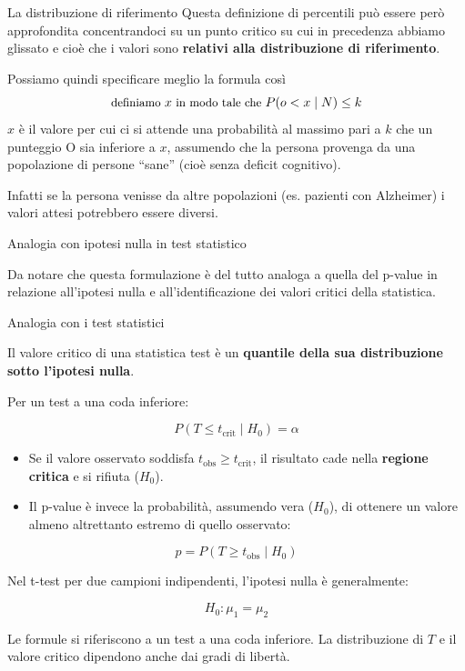 \documentclass[
  ignorenonframetext,
  aspectratio=169,
]{beamer}
\begin{document}
\begin{frame}{La distribuzione di riferimento}
\label{la-distribuzione-di-riferimento}
Questa definizione di percentili può essere però approfondita
concentrandoci su un punto critico su cui in precedenza abbiamo glissato
e cioè che i valori sono \textbf{relativi alla distribuzione di
riferimento}.

Possiamo quindi specificare meglio la formula così \[
\small
\text{definiamo}\ x\ \text{in modo tale che}\ P(o < x \mid N) \leq k
\] \(x\) è il valore per cui ci si attende una probabilità al massimo
pari a \(k\) che un punteggio O sia inferiore a \(x\), assumendo che la
persona provenga da una popolazione di persone ``sane'' (cioè senza
deficit cognitivo).

Infatti se la persona venisse da altre popolazioni (es. pazienti con
Alzheimer) i valori attesi potrebbero essere diversi.
\end{frame}

\begin{frame}{Analogia con ipotesi nulla in test statistico}
\label{analogia-con-ipotesi-nulla-in-test-statistico}
\small

Da notare che questa formulazione è del tutto analoga a quella del
p-value in relazione all'ipotesi nulla e all'identificazione dei valori
critici della statistica.
\end{frame}

\begin{frame}{Analogia con i test statistici}
\label{analogia-con-i-test-statistici}
\footnotesize

Il valore critico di una statistica test è un \textbf{quantile della sua
distribuzione sotto l'ipotesi nulla}.

Per un test a una coda inferiore:

\[
P(T \leq t_{\mathrm{crit}} \mid H_0) = \alpha
\]

\begin{itemize}
\item
  Se il valore osservato soddisfa
  \(t_{\mathrm{obs}} \geq t_{\mathrm{crit}}\), il risultato cade nella
  \textbf{regione critica} e si rifiuta (\(H_0\)).
\item
  Il p-value è invece la probabilità, assumendo vera (\(H_0\)), di
  ottenere un valore almeno altrettanto estremo di quello osservato:
\end{itemize}

\[
p = P(T \geq t_{\mathrm{obs}} \mid H_0)
\]

Nel t-test per due campioni indipendenti, l'ipotesi nulla è
generalmente:

\[
H_0:\mu_1=\mu_2
\]

Le formule si riferiscono a un test a una coda inferiore. La
distribuzione di \(T\) e il valore critico dipendono anche dai gradi di
libertà.
\end{frame}
\end{document}
